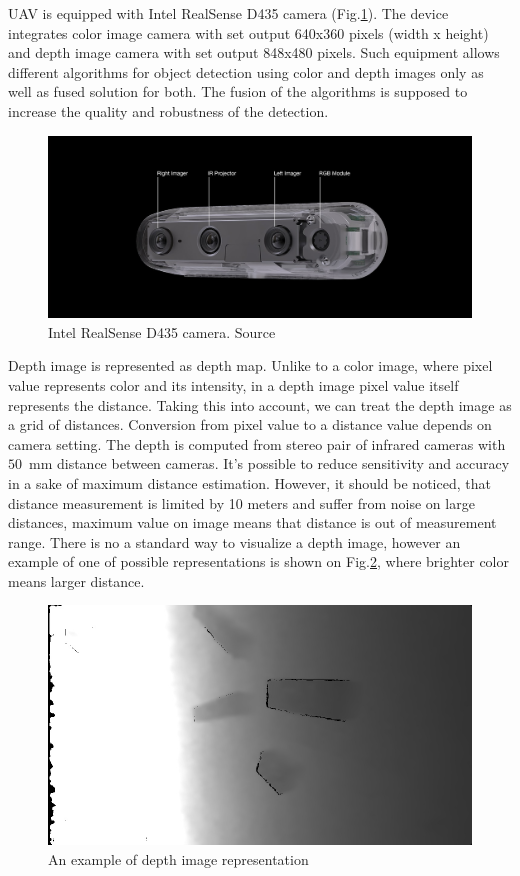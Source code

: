\documentclass{ctuthesis}
\begin{document}
UAV is equipped with Intel RealSense D435 camera (Fig.\ref{fig:d435}). The device integrates color image camera with set output 640x360 pixels (width x height) and depth image camera with set output 848x480 pixels. Such equipment allows different algorithms for object detection using color and depth images only as well as fused solution for both. The fusion of the algorithms is supposed to increase the quality and robustness of the detection.

\begin{figure}[htpb]
    \centering
    \includegraphics[width=\textwidth]{d435_camera_modules.jpg}
    \caption{Intel RealSense D435 camera. Source \cite{intel}}
    \label{fig:d435}
\end{figure}

Depth image is represented as depth map. Unlike to a color image, where pixel value represents color and its intensity, in a depth image pixel value itself represents the distance. Taking this into account, we can treat the depth image as a grid of distances. Conversion from pixel value to a distance value depends on camera setting. 
The depth is computed from stereo pair of infrared cameras with $50$~mm distance between cameras.
It's possible to reduce sensitivity and accuracy in a sake of maximum distance estimation. However, it should be noticed, that distance measurement is limited by 10 meters and suffer from noise on large distances, maximum value on image means that distance is out of measurement range. There is no a standard way to visualize a depth image, however an example of one of possible representations is shown on Fig.\ref{fig:1-3}, where brighter color means larger distance.

\begin{figure}[htpb]
    \centering
    \includegraphics[width=\textwidth]{depth_example.jpg}
    \caption{An example of depth image representation}
    \label{fig:1-3}
\end{figure}
\end{document}
